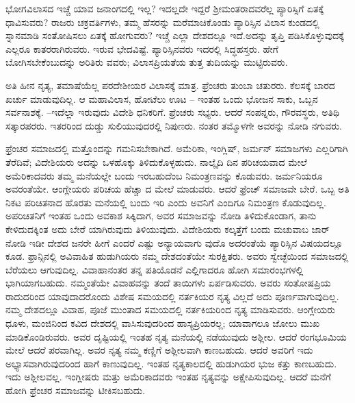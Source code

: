ಭೋಗವಿಲಾಸದ ಇಚ್ಚೆ ಯಾವ ಜನಾಂಗದಲ್ಲಿ ಇಲ್ಲ? ಇದಲ್ಲದೇ ಇದ್ದರೆ ಶ‍್ರೀಮಂತರಾದವರೆಲ್ಲ ಪ್ಯಾರಿಸ್ಸಿಗೆ ಏತಕ್ಕೆ ಧಾವಿಸುವರು? ರಾಜರು ಚಕ್ರವರ್ತಿಗಳು, ತಮ್ಮ ಹೆಸರನ್ನು ಮರೆಮಾಚಿಕೊಂಡು ಪ್ಯಾರಿಸ್ಸಿನ ವಿಲಾಸ ಕುಂಡದಲ್ಲಿ ಸ್ನಾನಮಾಡಿ ಸಂತೋಷಿಸಲು ಏತಕ್ಕೆ ಹೋಗುವರು? ಇಚ್ಚೆ ಎಲ್ಲಾ ದೇಶದಲ್ಲೂ ಇದೆ.ಅದನ್ನು ತೃಪ್ತಿ ಪಡಿಸಿಕೊಳ್ಳುವುದಕ್ಕೆ ಎಲ್ಲರೂ ಕಾತರರಾಗಿರುವರು. ಇರುವ ಭೇದವಿಷ್ಟೆ. ಪ್ಯಾರಿಸ್ಸಿನವರು ಇದರಲ್ಲಿ ಸಿದ್ಧಹಸ್ತರು. ಹೇಗೆ ಬೋಗಿಸಬೇಕೆಂಬುದನ್ನು ಅರಿತಿರು ವವರು; ವಿಲಾಸಪ್ರಿಯತೆಯ ತುತ್ತ ತುದಿಯನ್ನು ಮುಟ್ಟಿರುವರು.

ಅತಿ ಹೀನ ನೃತ್ಯ, ತಮಾಷೆಯೆಲ್ಲ ಪರದೇಶೀಯರ ವಿಲಾಸಕ್ಕೆ ಮಾತ್ರ. ಫ್ರೆಂಚರು ತುಂಬಾ ಚತುರರು. ಕೆಲಸಕ್ಕೆ ಬಾರದ ಖರ್ಚು ಮಾಡುವುದಿಲ್ಲ. ಆ ಮಹಾವಿಲಾಸ, ಹೋಟೆಲು ಊಟ – ಇಂತಹ ಒಂದು ಭೋಜನ ಸಾಕು, ಒಬ್ಬನ ಸರ್ವನಾಶಕ್ಕೆ. –ಇದೆಲ್ಲಾ ಇರುವುದು ವಿದೇಶಿ ಧನಿಕರಿಗೆ. ಫ್ರೆಂಚರು ಸಭ್ಯರು. ಆದರೆ ಸಂಪನ್ನರು, ಗೌರವಸ್ಥರು, ಅತಿಥಿ ಸತ್ಕಾರಪರರು. ಇತರರಿಂದ ದುಡ್ಡು ಸುಲಿಯುವುದರಲ್ಲಿ ನಿಪುಣರು. ನಂತರ ತಮ್ಮೊಳಗೇ ಅವರನ್ನು ನೋಡಿ ನಗುವರು.

ಫ್ರೆಂಚರ ಸಮಾಜದಲ್ಲಿ ಮತ್ತೊಂದನ್ನು ಗಮನಿಸಬೇಕಾಗಿದೆ. ಅಮೆರಿಕಾ, ಇಂಗ್ಲಿಷ್​, ಜರ್ಮನ್​ ಸಮಾಜಗಳು ಎಲ್ಲರಿಗಾಗಿ ತೆರೆದಿವೆ; ವಿದೇಶಿಯರು ಅದನ್ನು ಒಳಹೊಕ್ಕು ತಿಳಿದುಕೊಳ್ಳಹುದು. ನಾಲ್ಕೈದಿ ದಿನ ಪರಿಚಯವಾದ ಮೇಲೆ ಅಮೆರಿಕಾದವರು ತಮ್ಮ ಮನೆಯಲ್ಲೇ ಬಂದು ಇರಬಹುದೆಂಬ ನಿಮಂತ್ರಣವನ್ನು ಕೊಡುವರು. ಜರ್ಮನಿಯರೂ ಅವರಂತೆಯೇ. ಆಂಗ್ಲೇಯರು ಪರಿಚಯ ಹೆಚ್ಚಾ ದ ಮೇಲೆ ಮಾಡುವರು. ಆದರೆ ಫ್ರೆಂಚ್​ ಸಮಾಜವೇ ಬೇರೆ. ಒಬ್ಬ ಅತಿ ನಿಕಟ ಪರಿಚಿತನಾದ ಹೊರತು ಮನೆಯಲ್ಲಿ ಬಂದು ಇರಿ ಎಂದು ಅವನಿಗೆ ಎಂದಿಗೂ ನಿಮಂತ್ರಣ ಕೊಡುವುದಿಲ್ಲ. ಅಪರಿಚಿತನಿಗೆ ಇಂತಹ ಒಂದು ಅವಕಾಶ ಸಿಕ್ಕಿದಾಗ, ಅವರ ಸಮಾಜವನ್ನು ನೋಡಿ ತಿಳಿದುಕೊಂಡಾಗ, ತಾನು ಕೇಳಿದುದಕ್ಕಿಂತ ಅದು ಬೇರೆ ಯಾಗಿರುವುದು ತಿಳಿಯುವುದು. ವಿದೇಶಿಯರು ಕಲ್ಕತ್ತೆಗೆ ಬಂದು ಮಚುವಾಬ ಜಾರ್​ ನೋಡಿ ಇಡೀ ದೇಶದ ಜನರೇ ಹೀಗೆ ಎಂದರೆ ಎಷ್ಟು ಅನ್ಯಾಯವಾಗು ವುದೊ ಅದರಂತೆಯೆ ಪ್ಯಾರಿಸ್ಸಿನ ವಿಷಯದಲ್ಲೂ ಕೂಡ. ಫ್ರಾನ್ಸಿನಲ್ಲಿ ಅವಿವಾಹಿತ ಹುಡುಗಿಯರು ನಮ್ಮ ದೇಶದಂತೆಯೇ ಸುರಕ್ಷಿತರು. ಅವರು ಸ್ವೇಚ್ಛೆಯಿಂದ ಸಮಾಜದಲ್ಲಿ ಬೆರೆಯಲು ಆಗುವುದಿಲ್ಲ. ವಿವಾಹಾನಂತರ ತನ್ನ ಪತಿಯೊಡನೆ ಎಲ್ಲಿಗಾದರೂ ಹೋಗಿ ಸಮಾರಂಭಗಳಲ್ಲಿ ಭಾಗಿಯಾಗಬಹುದು. ನಮ್ಮಂತೆಯೇ ವಿವಾಹವನ್ನು ತಂದೆ ತಾಯಿಗಳು ಏರ್ಪಡಿಸುವರು. ಅವರು ಸಂತೋಷಪ್ರಿಯ ರಾದುದರಿಂದ ಯಾವುದಾದರೊಂದು ವಿಶೇಷ ಸಮಯದಲ್ಲಿ ನರ್ತಕಿಯರ ನೃತ್ಯ ವಿಲ್ಲದೆ ಅದು ಪೂರ್ಣವಾಗುವುದಿಲ್ಲ. ನಮ್ಮ ದೇಶದಲ್ಲೂ ವಿವಾಹ, ಪೂಜೆ ಮುಂತಾದ ಸಮಯದಲ್ಲಿ ನರ್ತಕಿಯರಿಂದ ನೃತ್ಯ ಮಾಡಿಸುವರು. ಆಂಗ್ಲೇಯರು ಧೂಳು, ಮಂಜಿನಿಂದ ಕವಿದ ದೇಶದಲ್ಲಿ ವಾಸಿಸುವುದರಿಂದ ಹಾಸ್ಯಪ್ರಿಯರಲ್ಲ; ಯಾವಾಗಲೂ ಜೋಲು ಮುಖ ಮಾಡಿಕೊಂಡಿರುವರು. ಅವರ ದೃಷ್ಟಿಯಲ್ಲಿ ಇಂತಹ ನೃತ್ಯ ಮನೆಯಲ್ಲಿ ನಡೆಯುವುದು ಅಶ್ಲೀಲ. ಆದರೆ ರಂಗಭೂಮಿಯ ಮೇಲೆ ಆದರೆ ಪರವಾಗಿಲ್ಲ. ಅವರ ನೃತ್ಯ ನಮ್ಮ ಕಣ್ಣಿಗೆ ಅಶ್ಲೀಲವಾಗಿ ಕಾಣಬಹುದು. ಆದರೆ ಅವರಿಗೆ ಇದು ಅಭ್ಯಾಸವಾಗಿರುವುದರಿಂದ ಹಾಗೆ ಕಾಣುವುದಿಲ್ಲ. ಇಂತಹ ನೃತ್ಯಕಾಲದಲ್ಲಿ ಹುಡುಗಿಯರ ಭುಜ ಕತ್ತು ಕಾಣಬಹುದು. ಇದು ಅಶ್ಲೀಲವಲ್ಲ. ಇಂಗ್ಲೀಷರು ಮತ್ತು ಅಮೆರಿಕಾದವರು ಇಂತಹ ನೃತ್ಯವನ್ನು ಅಕ್ಷೇಪಿಸುವುದಿಲ್ಲ. ಆದರೆ ಮನೆಗೆ ಹೋಗಿ ಫ್ರೆಂಚರ ಸಮಾಜವನ್ನು ಟೀಕಿಸಬಹುದು.

